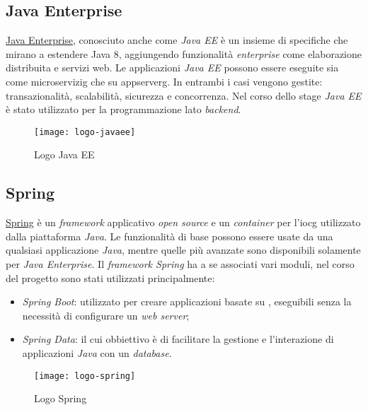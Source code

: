 \subsection{Java Enterprise}
\href{https://www.oracle.com/it/java/technologies/java-ee-glance.html}{Java Enterprise}, conosciuto anche come \textit{Java EE} è un insieme di specifiche che mirano a estendere Java 8, aggiungendo funzionalità \textit{enterprise} come elaborazione distribuita e servizi web. Le applicazioni \textit{Java EE} possono essere eseguite sia come \gls{microservizig}\glsfirstoccur{} che su \gls{appserverg}\glsfirstoccur{}. In entrambi i casi vengono gestite: transazionalità, scalabilità, sicurezza e concorrenza.
Nel corso dello stage \textit{Java EE} è stato utilizzato per la programmazione lato \textit{backend}.
\begin{figure}[h]
    \begin{center}
    \texttt{[image: logo-javaee]}
    \caption{Logo Java EE}
    \label{fig:figure3}
    \end{center}
\end{figure}

\subsection{Spring}
\href{https://spring.io/}{Spring} è un \textit{framework} applicativo \textit{open source} e un \textit{container} per l'\gls{iocg}\glsfirstoccur{} utilizzato dalla piattaforma \textit{Java}. Le funzionalità di base possono essere usate da una qualsiasi applicazione \textit{Java}, mentre quelle più avanzate sono disponibili solamente per \textit{Java Enterprise}.
Il \textit{framework Spring} ha a se associati vari moduli, nel corso del progetto sono stati utilizzati principalmente:
\begin{itemize}
    \item \textit{Spring Boot}: utilizzato per creare applicazioni basate su \textit{}, eseguibili senza la necessità di configurare un \textit{web server};
    \item \textit{Spring Data}: il cui obbiettivo è di facilitare la gestione e l'interazione di applicazioni \textit{Java} con un \textit{database}.
\end{itemize}
\begin{figure}[h]
    \begin{center}
    \texttt{[image: logo-spring]}
    \caption{Logo Spring}
    \label{fig:figure4}
    \end{center}
\end{figure}

